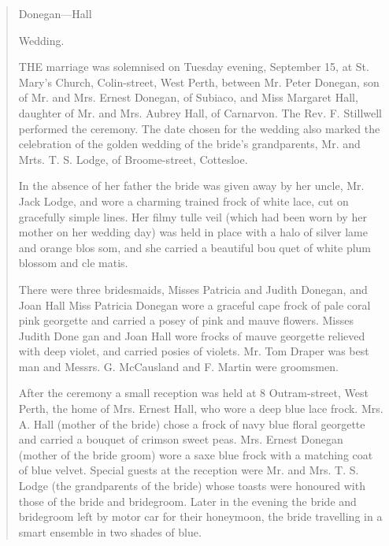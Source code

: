 \begin{quotation}
Donegan---Hall

Wedding.

THE marriage was solemnised on Tuesday evening, September 15, at St. Mary's Church, Colin-street, West Perth,
between Mr. Peter Donegan, son of Mr. and Mrs. Ernest Donegan, of Subiaco, and Miss Margaret Hall, daughter of Mr.
and Mrs. Aubrey Hall, of Carnarvon. The Rev. F. Stillwell performed the ceremony. The date chosen for the wedding
also marked the celebration of the golden wedding of the bride's grandparents, Mr. and Mrts. T. S. Lodge, of
Broome-street, Cottesloe.

In the absence of her father the bride was given away by her uncle, Mr. Jack Lodge, and wore a charming trained frock of
white lace, cut on gracefully simple lines. Her filmy tulle veil (which had been worn by her mother on her wedding day)
was held in place with a halo of silver lame and orange blos
som, and she carried a beautiful bou
quet of white plum blossom and cle
matis.

There were three bridesmaids, Misses
Patricia and Judith Donegan, and Joan
Hall Miss Patricia Donegan wore a
graceful cape frock of pale coral pink
georgette and carried a posey of pink
and mauve flowers. Misses Judith Done
gan and Joan Hall wore frocks of mauve
georgette relieved with deep violet, and
carried posies of violets. Mr. Tom Draper
was best man and Messrs. G. McCausland
and F. Martin were groomsmen.

After the ceremony a small reception
was held at 8 Outram-street, West Perth,
the home of Mrs. Ernest Hall, who wore
a deep blue lace frock. Mrs. A. Hall
(mother of the bride) chose a frock of
navy blue floral georgette and carried
a bouquet of crimson sweet peas. Mrs.
Ernest Donegan (mother of the bride groom) wore a saxe blue frock with a matching coat of blue velvet. Special guests at the reception were Mr. and Mrs. T. S. Lodge (the grandparents of the bride) whose toasts were honoured with those of the bride and bridegroom. Later in the evening the bride and bridegroom left by motor car for their honeymoon, the bride travelling in a smart ensemble in two shades of blue.
\end{quotation}
